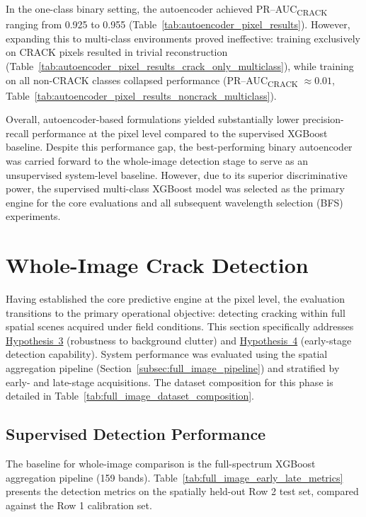 \noindent
In the one-class binary setting, the autoencoder achieved PR--AUC\textsubscript{CRACK} ranging from 0.925 to 0.955 (Table~\ref{tab:autoencoder_pixel_results}). However, expanding this to multi-class environments proved ineffective: training exclusively on CRACK pixels resulted in trivial reconstruction (Table~\ref{tab:autoencoder_pixel_results_crack_only_multiclass}), while training on all non-CRACK classes collapsed performance (PR--AUC\textsubscript{CRACK} $\approx 0.01$, Table~\ref{tab:autoencoder_pixel_results_noncrack_multiclass}).

\medskip
\noindent
Overall, autoencoder-based formulations yielded substantially lower precision-recall performance at the pixel level compared to the supervised XGBoost baseline. Despite this performance gap, the best-performing binary autoencoder was carried forward to the whole-image detection stage to serve as an unsupervised system-level baseline. However, due to its superior discriminative power, the supervised multi-class XGBoost model was selected as the primary engine for the core evaluations and all subsequent wavelength selection (BFS) experiments.

\section{Whole-Image Crack Detection}
\label{sec:full-image-early-late}

\noindent
Having established the core predictive engine at the pixel level, the evaluation transitions to the primary operational objective: detecting cracking within full spatial scenes acquired under field conditions. This section specifically addresses \hyperref[hyp:whole_image_robustness]{Hypothesis~3} (robustness to background clutter) and \hyperref[hyp:early_detection]{Hypothesis~4} (early-stage detection capability). System performance was evaluated using the spatial aggregation pipeline (Section~\ref{subsec:full_image_pipeline}) and stratified by early- and late-stage acquisitions. The dataset composition for this phase is detailed in Table~\ref{tab:full_image_dataset_composition}.

\subsection{Supervised Detection Performance}

\noindent
The baseline for whole-image comparison is the full-spectrum XGBoost aggregation pipeline (159 bands). Table~\ref{tab:full_image_early_late_metrics} presents the detection metrics on the spatially held-out Row 2 test set, compared against the Row 1 calibration set.

